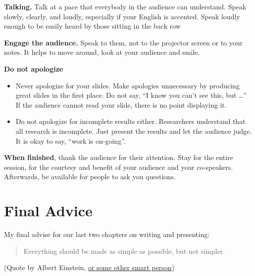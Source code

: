\documentclass[
]{book}
\providecommand{\tightlist}{%
  \setlength{\itemsep}{0pt}\setlength{\parskip}{0pt}}
\begin{document}
\textbf{Talking.} Talk at a pace that everybody in the audience can
understand. Speak slowly, clearly, and loudly, especially
if your English is accented. Speak
loudly enough to be easily heard by those sitting in
the back row

\textbf{Engage the audience.} Speak to them, not to the
projector screen or to your notes. It helps to move
around, look at your audience and smile.

\textbf{Do not apologize}

\begin{itemize}
\tightlist
\item
  Never apologize for your slides. Make apologies
  unnecessary by producing great slides in the first
  place. Do not say, ``I know you can't see this, but
  \ldots{}'' If the audience cannot read your slide, there is
  no point displaying it.
\item
  Do not apologize for incomplete results either.
  Researchers understand that all research is incomplete.
  Just present the results and let the audience
  judge. It is okay to say, ``work is on-going''.
\end{itemize}

\textbf{When finished}, thank the audience for their attention.
Stay for the entire session, for the courtesy
and benefit of your audience and your co-speakers.
Afterwards, be available for people to ask you questions.

\hfill\break

\hypertarget{final-advice}{%
\section*{Final Advice}\label{final-advice}}

My final advise for our last two chapters on writing and presenting:

\begin{quote}
Everything should be made as simple as possible, but not simpler.
\end{quote}

(Quote by Albert Einstein, \href{https://quoteinvestigator.com/2011/05/13/einstein-simple/}{or some other smart person})

  
\end{document}
